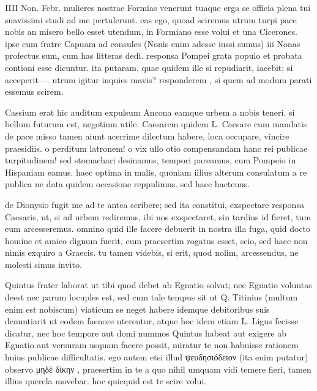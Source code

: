


 IIII Non. Febr. mulieres nostrae Formias venerunt tuaque erga se officia plena tui suavissimi studi ad me pertulerunt. eas ego, quoad sciremus utrum turpi pace nobis an misero bello esset utendum, in Formiano esse volui et una Cicerones. ipse cum fratre Capuam ad consules (Nonis enim adesse iussi sumus) iii Nonas profectus sum, cum has litteras dedi. responsa Pompei grata populo et probata contioni esse dicuntur. ita putaram. quae quidem ille si repudiarit, iacebit; si acceperit—. utrum igitur inquies mavis? responderem , si quem ad modum parati essemus scirem.

 Cassium erat hic auditum expulsum Ancona eamque urbem a nobis teneri. si bellum futurum est, negotium utile. Caesarem quidem L. Caesare cum mandatis de pace misso tamen aiunt acerrime dilectum habere, loca occupare, vincire praesidiis. o perditum latronem! o vix ullo otio compensandam hanc rei publicae turpitudinem! sed stomachari desinamus, tempori pareamus, cum Pompeio in Hispaniam eamus. haec optima in malis, quoniam illius alterum consulatum a re publica ne data quidem occasione reppulimus. sed haec hactenus.

 de Dionysio fugit me ad te antea scribere; sed ita constitui, exspectare responsa Caesaris, ut, si ad urbem rediremus, ibi nos exspectaret, sin tardius id fieret, tum eum arcesseremus. omnino quid ille facere debuerit in nostra illa fuga, quid docto homine et amico dignum fuerit, cum praesertim rogatus esset, scio, sed haec non nimis exquiro a Graecis. tu tamen videbis, si erit, quod nolim, arcessendus, ne molesti simus invito.

 Quintus frater laborat ut tibi quod debet ab Egnatio solvat; nec Egnatio voluntas deest nec parum locuples est, sed cum tale tempus sit ut Q. Titinius (multum enim est nobiscum) viaticum se neget habere idemque debitoribus suis denuntiarit ut eodem faenore uterentur, atque hoc idem etiam L. Ligus fecisse dicatur, nec hoc tempore aut domi nummos Quintus habeat aut exigere ab Egnatio aut versuram usquam facere possit, miratur te non habuisse rationem huius publicae difficultatis. ego autem etsi illud ψευδησιόδειον (ita enim putatur) observo μηδὲ δίκην , praesertim in te a quo nihil umquam vidi temere fieri, tamen illius querela movebar. hoc quicquid est te scire volui.

